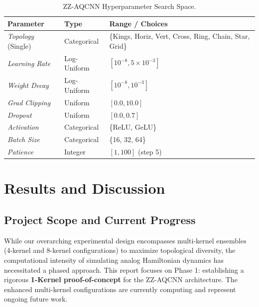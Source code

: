 \documentclass[11pt,a4paper]{article}
\begin{document}
\begin{table}[h]
    \centering
    \caption{ZZ-AQCNN Hyperparameter Search Space.}
    \begin{tabular}{lll}
        \toprule
        Parameter & Type & Range / Choices \\
        \midrule
        \textit{Topology} (Single) & Categorical & \{Kings, Horiz, Vert, Cross, Ring, Chain, Star, Grid\} \\
        \textit{Learning Rate} & Log-Uniform & $[10^{-8}, 5 \times 10^{-3}]$ \\
        \textit{Weight Decay} & Log-Uniform & $[10^{-8}, 10^{-3}]$ \\
        \textit{Grad Clipping} & Uniform & $[0.0, 10.0]$ \\
        \textit{Dropout} & Uniform & $[0.0, 0.7]$ \\
        \textit{Activation} & Categorical & \{ReLU, GeLU\} \\
        \textit{Batch Size} & Categorical & \{16, 32, 64\} \\
        \textit{Patience} & Integer & $[1, 100]$ (step 5) \\
        \bottomrule
    \end{tabular}
    \label{tab:hp_search}
\end{table}

\section{Results and Discussion}

\subsection{Project Scope and Current Progress}
While our overarching experimental design encompasses multi-kernel ensembles (4-kernel and 8-kernel configurations) to maximize topological diversity, the computational intensity of simulating analog Hamiltonian dynamics has necessitated a phased approach. This report focuses on Phase 1: establishing a rigorous \textbf{1-Kernel proof-of-concept} for the ZZ-AQCNN architecture. The enhanced multi-kernel configurations are currently computing and represent ongoing future work.
\end{document}

